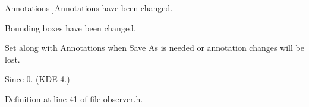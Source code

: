 \begin{Desc}
\begin{description}
{\hypertarget{classOkular_1_1DocumentObserver_af0e6b09d5fc7ecb673bd4895ef2710dca05bd23206e8303026c0b598095d8552e}{Annotations}\label{classOkular_1_1DocumentObserver_af0e6b09d5fc7ecb673bd4895ef2710dca05bd23206e8303026c0b598095d8552e}
}]Annotations have been changed. \item[{\em 
\hypertarget{classOkular_1_1DocumentObserver_af0e6b09d5fc7ecb673bd4895ef2710dca55dd38c482d00976565314a6b353e948}{Bounding\+Box}\label{classOkular_1_1DocumentObserver_af0e6b09d5fc7ecb673bd4895ef2710dca55dd38c482d00976565314a6b353e948}
}]Bounding boxes have been changed. \item[{\em 
\hypertarget{classOkular_1_1DocumentObserver_af0e6b09d5fc7ecb673bd4895ef2710dca298f0e033e3f38626f037f2183853415}{Need\+Save\+As}\label{classOkular_1_1DocumentObserver_af0e6b09d5fc7ecb673bd4895ef2710dca298f0e033e3f38626f037f2183853415}
}]Set along with Annotations when Save As is needed or annotation changes will be lost. \begin{DoxySince}{Since}
0. (K\+D\+E 4.) 
\end{DoxySince}
\end{description}
\end{Desc}


Definition at line 41 of file observer.\+h.


